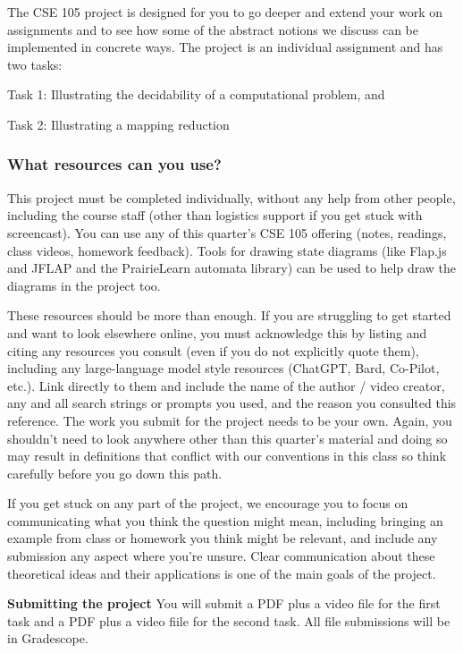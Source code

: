\thispagestyle{fancy}


The CSE 105 project is designed for you to go deeper and 
extend your work on assignments 
and to see how some of the abstract notions we discuss can 
be implemented in concrete ways. 
The project is an individual assignment and has two tasks: 

Task 1: Illustrating the decidability of a computational problem, and

Task 2: Illustrating a mapping reduction

\subsubsection*{What resources can you use?} This project must be completed individually, 
without any help from other people, including the course staff (other than logistics support if 
you get stuck with screencast).
You can use any of this quarter's CSE 105 offering (notes, readings, class videos, homework feedback). 
Tools for drawing state diagrams (like Flap.js and JFLAP and the PrairieLearn automata library) can be used to help draw the diagrams 
in the project too.

These resources should be more than enough.
If you are struggling to get started and want to look elsewhere online, 
you must acknowledge this by listing and citing any resources you consult 
(even if you do not explicitly quote them), including any large-language model style resources (ChatGPT, Bard, Co-Pilot, etc.). 
Link directly to them and include the name of the author / video creator, 
any and all search strings or prompts you used, and the reason you consulted this reference. The work you submit for the project needs to be your own. Again, you shouldn't need to look anywhere 
other than this quarter's material and doing so may result in definitions that
conflict with our conventions in this class so think carefully before you go down this path.

If you get stuck on any part of the project, we encourage you to focus on communicating what you think 
the question might mean, including bringing an example from class or homework you think might be relevant, and 
include any submission any aspect where you're unsure. Clear communication about these
theoretical ideas and their applications is one of the main goals of the project.

{\bf Submitting the project} You will submit a PDF plus a video file for the first task and a PDF plus a video fiile for the 
second task. All file submissions will be in Gradescope.


